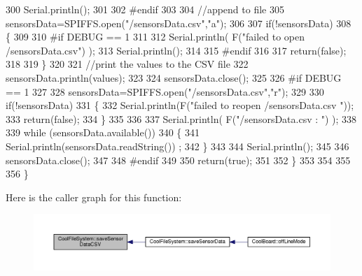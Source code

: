 \begin{DoxyCode}
300         Serial.println();
301     
302 \textcolor{preprocessor}{    #endif}
303 
304         \textcolor{comment}{//append to file}
305         sensorsData=SPIFFS.open(\textcolor{stringliteral}{"/sensorsData.csv"},\textcolor{stringliteral}{"a"});
306         
307         \textcolor{keywordflow}{if}(!sensorsData)
308         \{
309         
310 \textcolor{preprocessor}{        #if DEBUG == 1}
311             
312             Serial.println( F(\textcolor{stringliteral}{"failed to open /sensorsData.csv"}) );
313             Serial.println();
314 
315 \textcolor{preprocessor}{        #endif}
316             
317             \textcolor{keywordflow}{return}(\textcolor{keyword}{false});
318         
319         \}
320 
321         \textcolor{comment}{//print the values to the CSV file}
322         sensorsData.println(values);
323         
324         sensorsData.close();
325 
326 \textcolor{preprocessor}{    #if DEBUG == 1}
327 
328         sensorsData=SPIFFS.open(\textcolor{stringliteral}{"/sensorsData.csv"},\textcolor{stringliteral}{"r"});
329         
330         \textcolor{keywordflow}{if}(!sensorsData)
331         \{
332             Serial.println(F(\textcolor{stringliteral}{"failed to reopen /sensorsData.csv "}));
333             \textcolor{keywordflow}{return}(\textcolor{keyword}{false});      
334         \}
335 
336         
337         Serial.println( F(\textcolor{stringliteral}{"/sensorsData.csv : "}) );
338 
339         \textcolor{keywordflow}{while} (sensorsData.available()) 
340         \{
341             Serial.println(sensorsData.readString()) ;
342         \}
343         
344         Serial.println();
345         
346         sensorsData.close();
347         
348 \textcolor{preprocessor}{    #endif      }
349         
350         \textcolor{keywordflow}{return}(\textcolor{keyword}{true});
351     
352     \}   
353 
354 
355 
356 \}
\end{DoxyCode}
Here is the caller graph for this function\+:
\nopagebreak
\begin{figure}[H]
\begin{center}
\leavevmode
\includegraphics[width=350pt]{db/d0c/class_cool_file_system_ab78704d5d21ce10fc6f1138ab5ab46c8_icgraph}
\end{center}
\end{figure}
\mbox{\label{class_cool_file_system_adfa8e2e80641ae6f0cceabd348a9b841}} 
